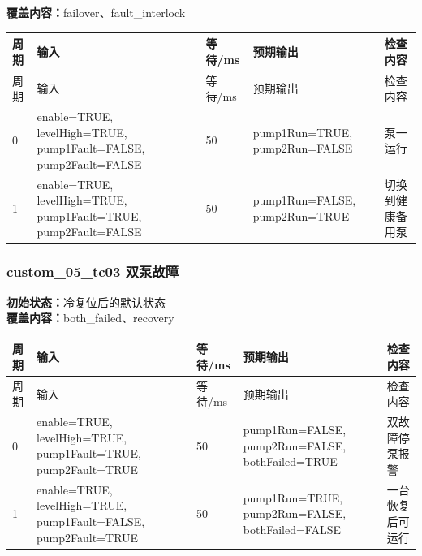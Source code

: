 \textbf{覆盖内容：}failover、fault\_interlock

\begin{longtable}{L{1.0cm}L{4.7cm}L{1.4cm}L{4.0cm}L{2.1cm}}

\toprule

周期 & 输入 & 等待/ms & 预期输出 & 检查内容\\

\midrule

\endfirsthead

\toprule

周期 & 输入 & 等待/ms & 预期输出 & 检查内容\\

\midrule

\endhead

0 & enable=TRUE, levelHigh=TRUE, pump1Fault=FALSE, pump2Fault=FALSE & 50 & pump1Run=TRUE, pump2Run=FALSE & 泵一运行\\

1 & enable=TRUE, levelHigh=TRUE, pump1Fault=TRUE, pump2Fault=FALSE & 50 & pump1Run=FALSE, pump2Run=TRUE & 切换到健康备用泵\\

\bottomrule

\end{longtable}

\subsubsection{{\ttfamily custom\_05\_tc03} 双泵故障}

\noindent\textbf{初始状态：}冷复位后的默认状态\\

\textbf{覆盖内容：}both\_failed、recovery

\begin{longtable}{L{1.0cm}L{4.7cm}L{1.4cm}L{4.0cm}L{2.1cm}}

\toprule

周期 & 输入 & 等待/ms & 预期输出 & 检查内容\\

\midrule

\endfirsthead

\toprule

周期 & 输入 & 等待/ms & 预期输出 & 检查内容\\

\midrule

\endhead

0 & enable=TRUE, levelHigh=TRUE, pump1Fault=TRUE, pump2Fault=TRUE & 50 & pump1Run=FALSE, pump2Run=FALSE, bothFailed=TRUE & 双故障停泵报警\\

1 & enable=TRUE, levelHigh=TRUE, pump1Fault=FALSE, pump2Fault=TRUE & 50 & pump1Run=TRUE, pump2Run=FALSE, bothFailed=FALSE & 一台恢复后可运行\\

\bottomrule

\end{longtable}

